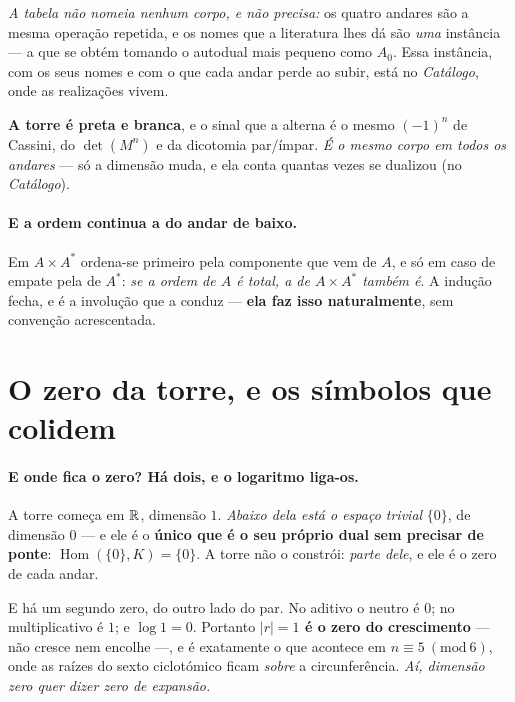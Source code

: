 \documentclass[livro.tex]{subfiles}
\begin{document}
\noindent \emph{A tabela não nomeia nenhum corpo, e não precisa:} os quatro andares são a mesma
operação repetida, e os nomes que a literatura lhes dá são \emph{uma} instância --- a que se
obtém tomando o autodual mais pequeno como $A_0$. Essa instância, com os seus nomes e com o que
cada andar perde ao subir, está no \emph{Catálogo}, onde as realizações vivem.

\noindent \textbf{A torre é preta e branca}, e o sinal que a alterna é o mesmo $(-1)^{n}$ de
Cassini, do $\det(M^{n})$ e da dicotomia par/ímpar. \emph{É o mesmo corpo em todos os andares} ---
só a dimensão muda, e ela conta quantas vezes se dualizou (no \emph{Catálogo}).

\paragraph{E a ordem continua a do andar de baixo.} Em $A\times A^{*}$ ordena-se primeiro pela
componente que vem de $A$, e só em caso de empate pela de $A^{*}$: \emph{se a ordem de $A$ é total,
a de $A\times A^{*}$ também é}. A indução fecha, e é a involução que a conduz --- \textbf{ela faz
isso naturalmente}, sem convenção acrescentada.


\section{O zero da torre, e os símbolos que colidem}\label{sec:zerotorre}

\paragraph{E onde fica o zero? Há dois, e o logaritmo liga-os.} A torre começa em $\mathbb R$, dimensão
$1$. \emph{Abaixo dela está o espaço trivial} $\{0\}$, de dimensão $0$ --- e ele é o \textbf{único
que é o seu próprio dual sem precisar de ponte}: $\operatorname{Hom}(\{0\},K)=\{0\}$. A torre não o
constrói: \emph{parte dele}, e ele é o zero de cada andar.

\noindent E há um segundo zero, do outro lado do par. No aditivo o neutro é $0$; no
multiplicativo é $1$; e $\log 1=0$. Portanto \textbf{$|r|=1$ é o zero do crescimento} --- não cresce
nem encolhe ---, e é exatamente o que acontece em $n\equiv5\ (\mathrm{mod}\ 6)$, onde as raízes do
sexto ciclotómico ficam \emph{sobre} a circunferência. \emph{Aí, dimensão zero quer dizer zero de
expansão.}
\end{document}
